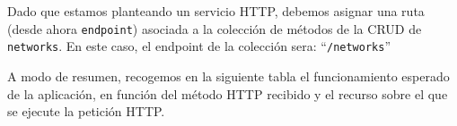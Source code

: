 \documentclass[a4paper, oneside, 12pt]{book}
\begin{document}
	\noindent Dado que estamos planteando un servicio HTTP, debemos asignar una ruta (desde ahora \texttt{endpoint}) asociada a la colección de métodos de la CRUD de \texttt{networks}. En este caso, el endpoint de la colección sera: ``\texttt{/networks}''
	
	\pagebreak
	
	\noindent A modo de resumen, recogemos en la siguiente tabla el funcionamiento esperado de la aplicación, en función del método HTTP recibido y el recurso sobre el que se ejecute la petición HTTP.
	
	\begin{table}[h!]
		\centering
\end{table}
\end{document}
